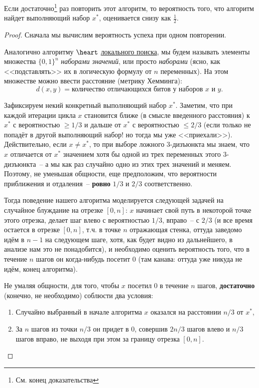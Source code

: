 \begin{theorem*}
	Если достаточно\footnote{См. конец доказательства} раз повторить этот алгоритм, то вероятность того, что алгоритм найдет выполняющий набор $x^*$, оценивается снизу как $\frac{1}{2}$.
\end{theorem*}
\begin{proof}
Сначала мы вычислим вероятность успеха при одном повторении.

Аналогично алгоритму \hyperlink{3satlocal}{$\heart~$локального поиска}, мы будем называть элементы множества $\{0, 1\}^n$ \textit{наборами значений}, или просто \textit{наборами} (ясно, как <<подставлять>> их в логическую формулу от $n$ переменных). На этом множестве можно ввести расстояние (метрику Хемминга):
$$d(x, y) = \text{количество отличающихся битов у наборов } x \text{ и } y.$$

Зафиксируем некий конкретный выполняющий набор $x^*$.
Заметим, что при каждой итерации цикла $x$ становится ближе (в смысле введенного расстояния) к $x^*$ с вероятностью $\geq 1/3$ и дальше от $x^*$ с вероятностью $\leq 2/3$ (если только не попадёт в другой выполняющий набор! но тогда мы уже <<приехали>>). Действительно, если $x \neq x^*$, то при выборе ложного 3-дизъюнкта мы знаем, что $x$ отличается от $x^*$ значением хотя бы одной из трех переменных этого 3-дизъюнкта~-- а мы как раз случайно одно из этих трех значений и меняем.
Поэтому, не уменьшая общности, еще предположим, что вероятности приближения и отдаления~-- \textbf{ровно} $1/3$ и $2/3$ соответственно.

Тогда поведение нашего алгоритма моделируется следующей задачей на случайное блуждание на отрезке $[0, n]$: $x$ начинает свой путь в некоторой точке этого отрезка, делает шаг влево с вероятностью $1/3$, вправо~-- с $2/3$ (и все время остается в отрезке $[0, n]$, т.ч. в точке $n$ отражающая стенка, оттуда заведомо идём в $n-1$ на следующем шаге, хотя, как будет видно из дальнейшего, в анализе нам это не понадобится), и необходимо оценить вероятность того, что в течение $n$ шагов он когда-нибудь посетит 0 (там канава: оттуда уже никуда не идём, конец алгоритма).

Не умаляя общности, для того, чтобы $x$ посетил 0 в течение $n$ шагов, \textbf{достаточно} (конечно, не необходимо) соблюсти два условия:
\begin{enumerate}
	\item Случайно выбранный в начале алгоритма $x$ оказался на расстоянии $n/3$ от $x^*$,
	\item За $n$ шагов из точки $n/3$ он придет в 0, совершив $2n/3$ шагов влево и $n/3$ шагов вправо, не выходя при этом за границу отрезка $[0,n]$.
\end{enumerate}


\end{proof}
